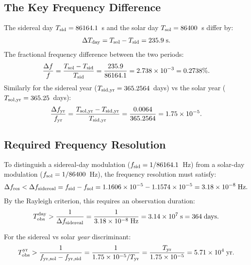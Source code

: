 \documentclass[aps,prd,twocolumn,superscriptaddress,nofootinbib]{revtex4-2}
\begin{document}
\subsection{The Key Frequency Difference}

The sidereal day $T_{\rm sid} = 86164.1$~s and the solar day
$T_{\rm sol} = 86400$~s differ by:
\begin{equation}
\Delta T_{\rm day} = T_{\rm sol} - T_{\rm sid} = 235.9\;\text{s}.
\label{eq:delta_T_day}
\end{equation}
The fractional frequency difference between the two periods:
\begin{equation}
\frac{\Delta f}{f} = \frac{T_{\rm sol} - T_{\rm sid}}{T_{\rm sid}}
= \frac{235.9}{86164.1} = 2.738\times10^{-3}
= 0.2738\%.
\label{eq:delta_f}
\end{equation}
Similarly for the sidereal year ($T_{\rm sid,yr} = 365.2564$~days) vs the
solar year ($T_{\rm sol,yr} = 365.25$~days):
\begin{equation}
\frac{\Delta f_{\rm yr}}{f_{\rm yr}} = \frac{T_{\rm sol,yr} - T_{\rm sid,yr}}{T_{\rm sid,yr}}
= \frac{0.0064}{365.2564} = 1.75\times10^{-5}.
\label{eq:delta_f_yr}
\end{equation}

\subsection{Required Frequency Resolution}

To distinguish a sidereal-day modulation ($f_{\rm sid} = 1/86164.1$~Hz)
from a solar-day modulation ($f_{\rm sol} = 1/86400$~Hz), the frequency
resolution must satisfy:
\begin{equation}
\Delta f_{\rm res} < \Delta f_{\rm sidereal} = f_{\rm sid} - f_{\rm sol}
= 1.1606\times10^{-5} - 1.1574\times10^{-5}
= 3.18\times10^{-8}\;\text{Hz}.
\label{eq:freq_res_day}
\end{equation}
By the Rayleigh criterion, this requires an observation duration:
\begin{equation}
T_{\rm obs}^{\rm day} > \frac{1}{\Delta f_{\rm sidereal}}
= \frac{1}{3.18\times10^{-8}\;\text{Hz}}
= 3.14\times10^7\;\text{s} = 364\;\text{days}.
\label{eq:T_day}
\end{equation}

For the sidereal vs solar \emph{year} discriminant:
\begin{equation}
T_{\rm obs}^{\rm yr} > \frac{1}{f_{\rm yr,sol} - f_{\rm yr,sid}}
= \frac{1}{1.75\times10^{-5}/T_{\rm yr}}
= \frac{T_{\rm yr}}{1.75\times10^{-5}}
= 5.71\times10^4\;\text{yr}.
\label{eq:T_yr}
\end{equation}
\end{document}
